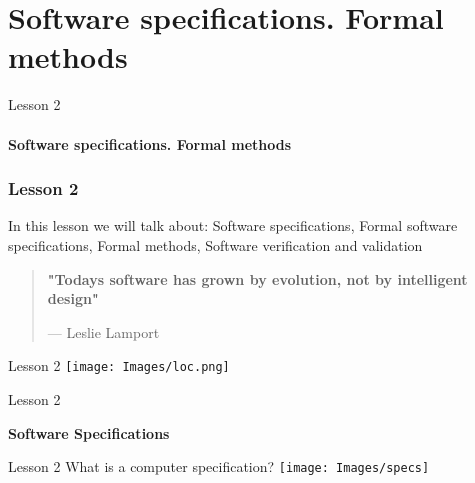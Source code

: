 \documentclass[aspectratio=1610]{beamer}
\begin{document}
\section{Software specifications. Formal methods}

\begin{frame}
\begin{center}
\Huge Lesson 2\\~\\
\textbf{Software specifications. Formal methods}
\end{center}
\end{frame}


\begin{frame}
\frametitle{Lesson 2}

\Huge In this lesson we will talk about:
 \alert{Software specifications},
 \alert{Formal software specifications, Formal methods},
 \alert{Software verification and validation}
\end{frame}



\begin{frame}
\begin{center}
\Huge
\begin{quote}
\textbf{"Todays software has grown by evolution, not by intelligent design"}
\begin{flushright}
{--- Leslie Lamport}	
\end{flushright}
\end{quote}
\end{center}
\end{frame}


\begin{frame}{Lesson 2}{}
\texttt{[image: Images/loc.png]}
\end{frame}


\begin{frame}{Lesson 2}{}
\begin{center}
\Huge\textbf{Software Specifications}
\end{center}
\end{frame}


\begin{frame}{Lesson 2}{}
\Huge{What is a computer specification?}
\texttt{[image: Images/specs]}
\end{frame}
\end{document}
